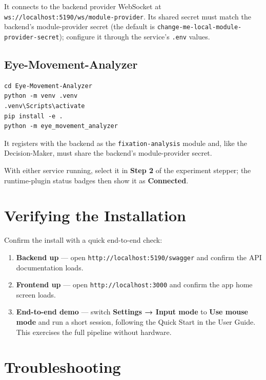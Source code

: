 It connects to the backend provider WebSocket at \texttt{ws://localhost:5190/ws/module-provider}. Its
shared secret must match the backend's module-provider secret (the default is
\texttt{change-me-local-module-provider-secret}); configure it through the service's \texttt{.env} values.

\subsection{Eye-Movement-Analyzer}\label{82-eye-movement-analyzer}

\begin{Verbatim}[breaklines=true,breakanywhere=true,fontsize=\small]
cd Eye-Movement-Analyzer
python -m venv .venv
.venv\Scripts\activate
pip install -e .
python -m eye_movement_analyzer
\end{Verbatim}

It registers with the backend as the \texttt{fixation-analysis} module and, like the Decision-Maker, must
share the backend's module-provider secret.

With either service running, select it in \textbf{Step 2} of the experiment stepper; the runtime-plugin
status badges then show it as \textbf{Connected}.

\FloatBarrier
\section{Verifying the Installation}\label{9-verifying-the-installation}

Confirm the install with a quick end-to-end check:

\begin{enumerate}
\def\labelenumi{\arabic{enumi}.}
\tightlist
\item
  \textbf{Backend up} --- open \texttt{http://localhost:5190/swagger} and confirm the API documentation loads.
\item
  \textbf{Frontend up} --- open \texttt{http://localhost:3000} and confirm the app home screen loads.
\item
  \textbf{End-to-end demo} --- switch \textbf{Settings → Input mode} to \textbf{Use mouse mode} and run a short
  session, following the Quick Start in the User Guide. This exercises the full pipeline without
  hardware.
\end{enumerate}

\FloatBarrier
\section{Troubleshooting}\label{10-troubleshooting}

